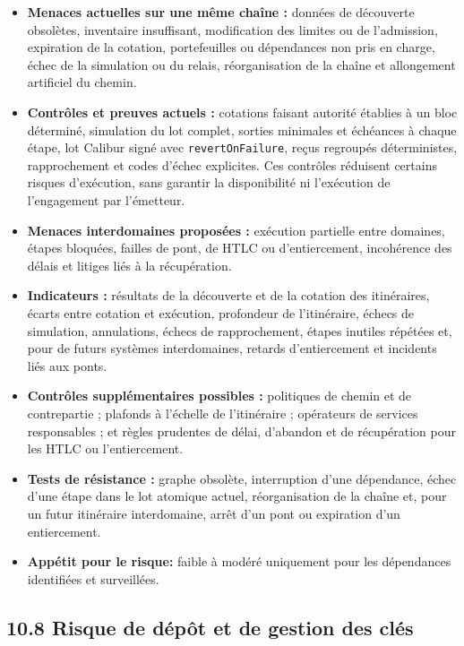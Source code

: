 \documentclass[11pt]{article}
\begin{document}
\begin{itemize}[leftmargin=*]
\item \textbf{Menaces actuelles sur une même chaîne :} données de découverte obsolètes, inventaire insuffisant, modification des limites ou de l'admission, expiration de la cotation, portefeuilles ou dépendances non pris en charge, échec de la simulation ou du relais, réorganisation de la chaîne et allongement artificiel du chemin.
\item \textbf{Contrôles et preuves actuels :} cotations faisant autorité établies à un bloc déterminé, simulation du lot complet, sorties minimales et échéances à chaque étape, lot Calibur signé avec \texttt{revertOnFailure}, reçus regroupés déterministes, rapprochement et codes d'échec explicites. Ces contrôles réduisent certains risques d'exécution, sans garantir la disponibilité ni l'exécution de l'engagement par l'émetteur.
\item \textbf{Menaces interdomaines proposées :} exécution partielle entre domaines, étapes bloquées, failles de pont, de HTLC ou d'entiercement, incohérence des délais et litiges liés à la récupération.
\item \textbf{Indicateurs :} résultats de la découverte et de la cotation des itinéraires, écarts entre cotation et exécution, profondeur de l'itinéraire, échecs de simulation, annulations, échecs de rapprochement, étapes inutiles répétées et, pour de futurs systèmes interdomaines, retards d'entiercement et incidents liés aux ponts.
\item \textbf{Contrôles supplémentaires possibles :} politiques de chemin et de contrepartie ; plafonds à l'échelle de l'itinéraire ; opérateurs de services responsables ; et règles prudentes de délai, d'abandon et de récupération pour les HTLC ou l'entiercement.
\item \textbf{Tests de résistance :} graphe obsolète, interruption d'une dépendance, échec d'une étape dans le lot atomique actuel, réorganisation de la chaîne et, pour un futur itinéraire interdomaine, arrêt d'un pont ou expiration d'un entiercement.
\item \textbf{Appétit pour le risque:} faible à modéré uniquement pour les dépendances identifiées et surveillées.
\end{itemize}
\subsection*{10.8 Risque de dépôt et de gestion des clés}
\end{document}
